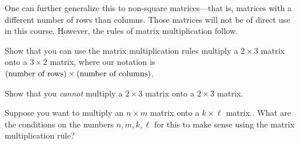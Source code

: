One can further generalize this to non-square matrices---that is, matrices with a different number of rows than columns. Those matrices will not be of direct use in this course. However, the rules of matrix multiplication follow.
\begin{exercise}
Show that you can use the matrix multiplication rules multiply a $2\times 3$ matrix onto a $3\times 2$ matrix, where our notation is $(\textnormal{number of rows})\times(\textnormal{number of columns})$.
\end{exercise}
\begin{exercise}
Show that you \emph{cannot} multiply a $2\times 3$ matrix onto a $2 \times 3$ matrix. 
\end{exercise}
\begin{exercise}
Suppose you want to multiply an $n\times m$ matrix onto a $k \times \ell$ matrix.. What are the conditions on the numbers $n, m, k, \ell$ for this to make sense using the matrix multiplication rule?
\end{exercise}



